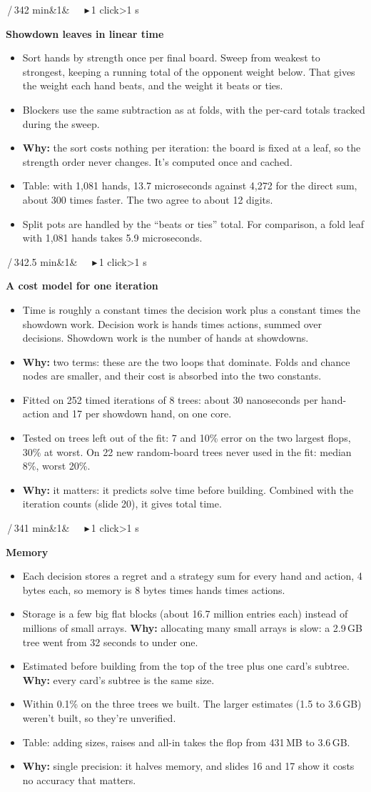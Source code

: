 \documentclass{article}
\newcommand{\slide}[4]{\clearpage
  \noindent\colorbox{bar}{\parbox{\dimexpr\linewidth-2\fboxsep}{\color{white}\fontsize{13}{15}\selectfont
  \textbf{\fontsize{21}{23}\selectfont #1}\,/\,34\hfill #3\ifx&#4&\else\ \ \ \textcolor{ck!40!white}{\ensuremath{\blacktriangleright}}\,#4 click\ifnum#4>1 s\fi\fi\\[2pt]
  \raggedright\textbf{\fontsize{15}{17.5}\selectfont #2}}}\par\vspace{5pt}
  \fontsize{15}{17.8}\selectfont\raggedright}
\newcommand{\pt}{\item[\textbullet]}
\newcommand{\ck}{\item[\textcolor{ck}{\ensuremath{\blacktriangleright}}]}
\newcommand{\why}{\textcolor{why}{\textbf{Why:}} }
\begin{document}
\slide{13}{Showdown leaves in linear time}{2 min}{1}
\begin{itemize}
\pt Sort hands by strength once per final board. Sweep from weakest to strongest, keeping a running total of the opponent weight below. That gives the weight each hand beats, and the weight it beats or ties.
\pt Blockers use the same subtraction as at folds, with the per-card totals tracked during the sweep.
\pt \why the sort costs nothing per iteration: the board is fixed at a leaf, so the strength order never changes. It's computed once and cached.
\ck Table: with 1,081 hands, 13.7 microseconds against 4,272 for the direct sum, about 300 times faster. The two agree to about 12 digits.
\pt Split pots are handled by the ``beats or ties'' total. For comparison, a fold leaf with 1,081 hands takes 5.9 microseconds.
\end{itemize}

\slide{14}{A cost model for one iteration}{2.5 min}{1}
\begin{itemize}
\pt Time is roughly a constant times the decision work plus a constant times the showdown work. Decision work is hands times actions, summed over decisions. Showdown work is the number of hands at showdowns.
\pt \why two terms: these are the two loops that dominate. Folds and chance nodes are smaller, and their cost is absorbed into the two constants.
\ck Fitted on 252 timed iterations of 8 trees: about 30 nanoseconds per hand-action and 17 per showdown hand, on one core.
\pt Tested on trees left out of the fit: 7 and 10\% error on the two largest flops, 30\% at worst. On 22 new random-board trees never used in the fit: median 8\%, worst 20\%.
\pt \why it matters: it predicts solve time before building. Combined with the iteration counts (slide 20), it gives total time.
\end{itemize}

\slide{15}{Memory}{1 min}{1}
\begin{itemize}
\pt Each decision stores a regret and a strategy sum for every hand and action, 4 bytes each, so memory is 8 bytes times hands times actions.
\pt Storage is a few big flat blocks (about 16.7 million entries each) instead of millions of small arrays. \why allocating many small arrays is slow: a 2.9\,GB tree went from 32 seconds to under one.
\ck Estimated before building from the top of the tree plus one card's subtree. \why every card's subtree is the same size.
\pt Within 0.1\% on the three trees we built. The larger estimates (1.5 to 3.6\,GB) weren't built, so they're unverified.
\pt Table: adding sizes, raises and all-in takes the flop from 431\,MB to 3.6\,GB.
\pt \why single precision: it halves memory, and slides 16 and 17 show it costs no accuracy that matters.
\end{itemize}
\end{document}
